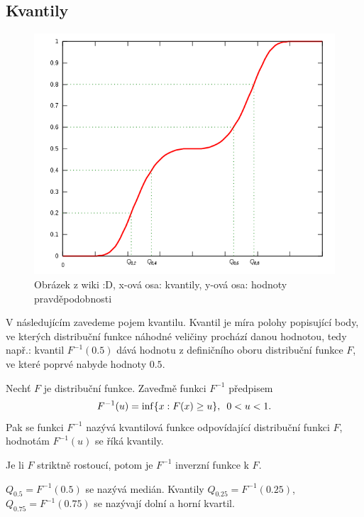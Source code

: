 \subsection{Kvantily}
\begin{figure}[h]
\begin{center}
\includegraphics[scale=0.5]{Obrazky/600px-Quantile.png}
\caption{Obrázek z wiki :D, x-ová osa: kvantily, y-ová osa: hodnoty pravděpodobnosti}
\end{center}
\end{figure}
V následujícím zavedeme pojem kvantilu. Kvantil je míra polohy popisující body, ve kterých distribuční funkce náhodné veličiny prochází danou hodnotou, tedy např.: kvantil $F^{-1}(0.5)$ dává hodnotu z definičního oboru distribuční funkce $F$, ve které poprvé nabyde hodnoty $0.5$.
\begin{definition}
Nechť $F$ je distribuční funkce. Zaveďmě funkci $F^{-1}$ předpisem
\begin{equation}
F^{-1}(u) = \inf\lbrace x : F(x) \geq u \rbrace, \enskip 0 < u < 1.
\end{equation}
Pak se funkci $F^{-1}$ nazývá kvantilová funkce odpovídající distribuční funkci $F$, hodnotám $F^{-1}(u)$ se říká kvantily.
\end{definition}

\begin{remark}
Je li $F$ striktně rostoucí, potom je $F^{-1}$ inverzní funkce k $F$.
\end{remark}

\begin{remark}
$Q_{0.5} = F^{-1}(0.5)$ se nazývá medián. Kvantily $Q_{0.25} = F^{-1}(0.25)$, $Q_{0.75} = F^{-1}(0.75)$ se nazývají dolní a horní kvartil.
\end{remark}
